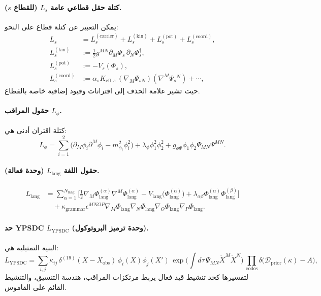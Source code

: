 \documentclass[13pt,a4paper]{article}
\begin{document}
	\paragraph{كتلة حقل قطاعي عامة $L_s$ (للقطاع $s$).}
	يمكن التعبير عن كتلة قطاع على النحو:
	\begin{align}
		L_s &= L^{(\mathrm{carrier})}_s + L^{(\mathrm{kin})}_s + L^{(\mathrm{pot})}_s + L^{(\mathrm{coord})}_s, \\
		L^{(\mathrm{kin})}_s &:= \frac{1}{2}g^{MN}\partial_M\Phi_s\,\partial_N\Phi_s^\dagger, \\
		L^{(\mathrm{pot})}_s &:= -V_s(\Phi_s), \\
		L^{(\mathrm{coord})}_s &:= \alpha_s K_{\mathrm{eff},s}\,(\nabla_M\Psi_{sN})(\nabla^M\Psi_{s}{}^{N}) + \cdots,
	\end{align}
	حيث تشير علامة الحذف إلى اقترانات وقيود إضافية خاصة بالقطاع.
	
	\paragraph{حقول المراقب $L_{\phi}$.}
	كتلة اقتران أدنى هي:
	\begin{equation}
		L_{\phi}=\sum_{i=1}^{2}\Big(\partial_M\phi_i\partial^M\phi_i - m_{\phi_i}^2\phi_i^2\Big) + \lambda_{\phi}\phi_1^2\phi_2^2 + g_{\phi\Psi}\phi_1\phi_2\Psi_{MN}\Psi^{MN}.
	\end{equation}
	
	\paragraph{حقول اللغة $L_{\mathrm{lang}}$ (وحدة فعالة).}
	\begin{align}
		L_{\mathrm{lang}} &= \sum_{\alpha=1}^{N_{\mathrm{lang}}}\Big[
		\frac{1}{2}\nabla_M\Phi_{\mathrm{lang}}^{(\alpha)}\nabla^M\Phi_{\mathrm{lang}}^{(\alpha)}
		- V_{\mathrm{lang}}\big(\Phi_{\mathrm{lang}}^{(\alpha)}\big)
		+ \lambda_{\alpha\beta}\Phi_{\mathrm{lang}}^{(\alpha)}\Phi_{\mathrm{lang}}^{(\beta)}
		\Big] \nonumber\\
		&\quad + \kappa_{\mathrm{grammar}}\epsilon^{MNOP}\nabla_M\Phi_{\mathrm{lang}}\nabla_N\Phi_{\mathrm{lang}}\nabla_O\Phi_{\mathrm{lang}}\nabla_P\Phi_{\mathrm{lang}}.
	\end{align}
	
	\paragraph{حد YPSDC $L_{\mathrm{YPSDC}}$ (وحدة ترميز البروتوكول).}
	البنية التمثيلية هي:
	\begin{equation}
		L_{\mathrm{YPSDC}} = \sum_{i,j}\kappa_{ij}\,\delta^{(19)}(X-X_{\mathrm{obs}})\,\phi_i(X)\phi_j(X')\,
		\exp\!\Big(\int d\tau\,\Psi_{MN}\dot X^M\dot X^N\Big)\,
		\prod_{\mathrm{codes}}\delta\big(\mathcal{D}_{\mathrm{prior}}(\kappa)-A\big),
	\end{equation}
	لتفسيرها كحد تنشيط قيد فعال يربط مرتكزات المراقب، هندسة التنسيق، والتنشيط القائم على القاموس.
	
\end{document}
